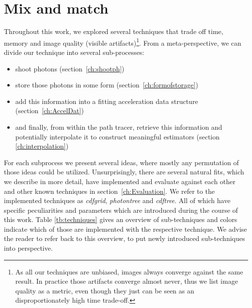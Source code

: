 \section{Mix and match}

Throughout this work, we explored several techniques that trade off time, memory and image quality (visible artifacts)\footnote{As all our techniques are unbiased, images always converge against the same result. In practice those artifacts converge almost never, thus we list image quality as a metric, even though they just can be seen as an disproportionately high time trade-off.}. From a meta-perspective, we can divide our technique into several sub-processes:

\begin{itemize}
    \item shoot photons (section~\ref{ch:shootph})
    \item store those photons in some form (section~\ref{ch:formofstorage})
    \item add this information into a fitting acceleration data structure (section~\ref{ch:AccelDat})
    \item and finally, from within the path tracer, retrieve this information and potentially interpolate it to construct meaningful estimators (section \ref{ch:interpolation})
\end{itemize}

For each subprocess we present several ideas, where mostly any permutation of those ideas could be utilized. Unsurprisingly, there are several natural fits, which we describe in more detail, have implemented and evaluate against each other and other known techniques in section~\ref{ch:Evaluation}. We refer to the implemented techniques as \textit{cdfgrid}, \textit{photontree} and \textit{cdftree}. All of which have specific peculiarities and parameters which are introduced during the course of this work. Table \ref{tb:techniques} gives an overview of sub-techniques and colors indicate which of those are implemented with the respective technique. We advise the reader to refer back to this overview, to put newly introduced sub-techniques into perspective.

